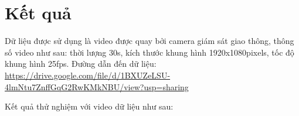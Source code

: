 \documentclass[a4paper]{article}
\begin{document}
\section{Kết quả}
Dữ liệu được sử dụng là video được quay bởi camera giám sát giao thông, thông số video như sau: thời lượng 30s, kích thước khung hình 1920x1080pixels, tốc độ khung hình 25fps. Đường dẫn đến dữ liệu: \url{https://drive.google.com/file/d/1BXUZeLSU-4lmNtu7ZnffGqG2RwKMkNBU/view?usp=sharing}

Kết quả thử nghiệm với video dữ liệu như sau: 
\end{document}
